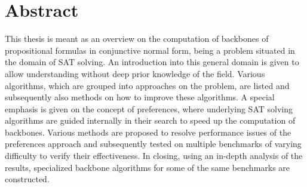 \chapter*{Abstract}
This thesis is meant as an overview on the computation of backbones of propositional formulas in conjunctive normal form, being a problem situated in the domain of SAT solving. An introduction into this general domain is given to allow understanding without deep prior knowledge of the field. Various algorithms, which are grouped into approaches on the problem, are listed and subsequently also methods on how to improve these algorithms. A special emphasis is given on the concept of preferences, where underlying SAT solving algorithms are guided internally in their search to speed up the computation of backbones. Various methods are proposed to resolve performance issues of the preferences approach and subsequently tested on multiple benchmarks of varying difficulty to verify their effectiveness. In closing, using an in-depth analysis of the results, specialized backbone algorithms for some of the same benchmarks are constructed.